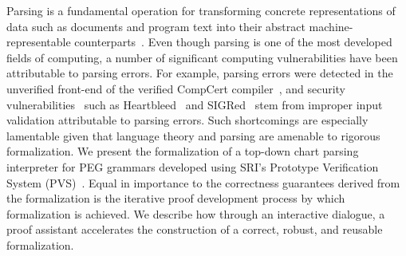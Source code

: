Parsing is a fundamental operation for transforming concrete
representations of data such as documents and program text into their
abstract machine-representable counterparts~\cite{GruneJacobs}.  Even though parsing is
one of the most developed fields of computing, a number of significant
computing vulnerabilities have been attributable to parsing
errors. For example,  parsing errors were detected in the unverified
front-end of the verified CompCert
compiler~\cite{csmith}, and security vulnerabilities~\cite{DBLP:journals/usenix-login/BratusHHLMPS17} such as Heartbleed~\cite{carvalho2014heartbleed}  
and SIGRed~\cite{SIGRed} stem from improper input
validation attributable to parsing errors. Such shortcomings are
especially lamentable given that language theory and parsing are
amenable to rigorous formalization.   We present the formalization of a
top-down chart parsing interpreter for PEG grammars developed using
SRI's Prototype Verification System (PVS)~\cite{Owre95:prolegomena}.  Equal in importance to
the correctness guarantees derived from the formalization
is the iterative proof development process by which formalization is achieved.
We  describe how through an interactive dialogue, a proof
assistant accelerates the construction of a correct, robust, and
reusable formalization.




